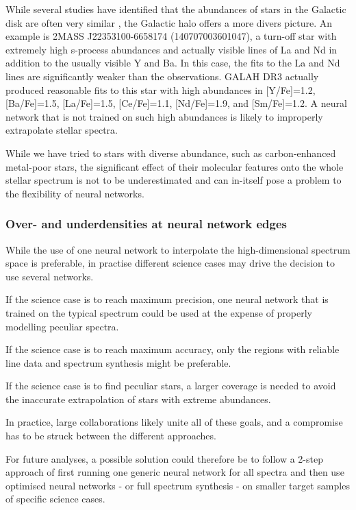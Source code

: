 \documentclass[
  journal=pasa,
  manuscript=research-paper, %
  year=2023,
  volume=37
]{cup-journal}
\begin{document}
While several studies have identified that the abundances of stars in the Galactic disk are often very similar \citep[e.g.][]{Ness2019b}, the Galactic halo offers a more divers picture. An example is 2MASS J22353100-6658174 (140707003601047), a turn-off star with extremely high s-process abundances and actually visible lines of La and Nd in addition to the usually visible Y and Ba. In this case, the fits to the La and Nd lines are significantly weaker than the observations. GALAH DR3 actually produced reasonable fits to this star with high abundances in [Y/Fe]=1.2, [Ba/Fe]=1.5, [La/Fe]=1.5, [Ce/Fe]=1.1, [Nd/Fe]=1.9, and [Sm/Fe]=1.2. A neural network that is not trained on such high abundances is likely to improperly extrapolate stellar spectra.

While we have tried to stars with diverse abundance, such as carbon-enhanced metal-poor stars, the significant effect of their molecular features onto the whole stellar spectrum is not to be underestimated and can in-itself pose a problem to the flexibility of neural networks.

\subsubsection{Over- and underdensities at neural network edges}

While the use of one neural network to interpolate the high-dimensional spectrum space is preferable, in practise different science cases may drive the decision to use several networks.

If the science case is to reach maximum precision, one neural network that is trained on the typical spectrum could be used at the expense of properly modelling peculiar spectra.

If the science case is to reach maximum accuracy, only the regions with reliable line data and spectrum synthesis might be preferable.

If the science case is to find peculiar stars, a larger coverage is needed to avoid the inaccurate extrapolation of stars with extreme abundances.

In practice, large collaborations likely unite all of these goals, and a compromise has to be struck between the different approaches.

For future analyses, a possible solution could therefore be to follow a 2-step approach of first running one generic neural network for all spectra and then use optimised neural networks - or full spectrum synthesis - on smaller target samples of specific science cases.
\end{document}

